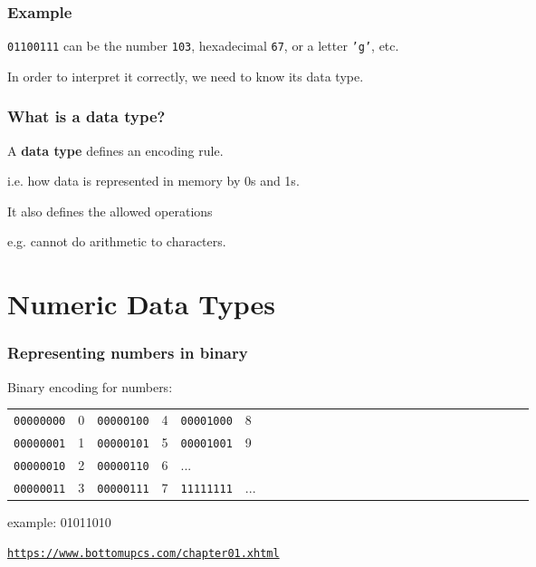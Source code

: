 \documentclass[11pt]{beamer}
\begin{document}
\begin{frame}
  \frametitle{Example}
  \Enlarge

  \texttt{01100111} can be the number \texttt{103}, hexadecimal \texttt{67}, or a letter \texttt{'g'}, etc. \\ \pause
  
  \vspace{4mm}
  In order to interpret it correctly, we need to know its data type.
\end{frame}

\begin{frame}
  \frametitle{What is a \textbf{data type}?}
  \Enlarge
  \Enlarge

  \begin{itemize}
  \myitem  A \textbf{data type} defines an encoding rule. \pause
  \begin{itemize}
  \mysubitem  i.e. how data is represented in memory by 0s and 1s. \pause
  \end{itemize}
  \myitem  It also defines the allowed operations 
  \begin{itemize}
  	\mysubitem e.g. cannot do arithmetic to characters.
  \end{itemize}
  \end{itemize}
\end{frame}


\section{Numeric Data Types}

\begin{frame}
  \frametitle{Representing numbers in binary}
  \Enlarge

  \begin{itemize}
  \myitem  Binary encoding for numbers:
    \begin{tabular}{*{27}{l}}
      \texttt{00000000} & 0 & \texttt{00000100} & 4 & \texttt{00001000} & 8\\
      \texttt{00000001} & 1 & \texttt{00000101} & 5 & \texttt{00001001} & 9\\
      \texttt{00000010} & 2 & \texttt{00000110} & 6 & ... & \\
      \texttt{00000011} & 3 & \texttt{00000111} & 7 & \texttt{11111111} & ...\\
    \end{tabular}\pause
  
  \myitem example: 01011010
  \end{itemize} \pause
  
  
  \hspace{7mm} \textcolor{blue}{\small \texttt{\url{https://www.bottomupcs.com/chapter01.xhtml}}} 
  
\end{frame}
\end{document}
